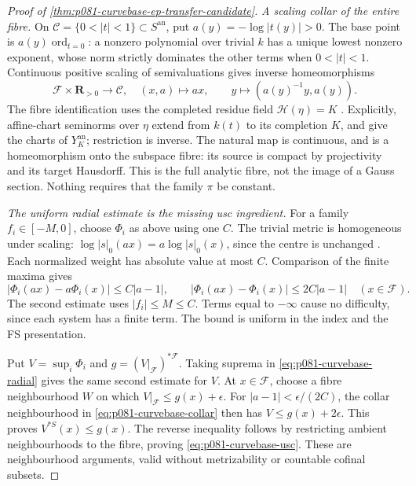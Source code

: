 \begin{proof}[Proof of \cref{thm:p081-curvebase-ep-transfer-candidate}]
\emph{A scaling collar of the entire fibre.}
On \(\mathcal C=\{0<|t|<1\}\subset S^{\mathrm{an}}\), put
\(a(y)=-\log|t(y)|>0\). The base point is
\(a(y)\operatorname{ord}_{t=0}\): a nonzero polynomial over trivial
\(k\) has a unique lowest nonzero exponent, whose norm strictly
dominates the other terms when \(0<|t|<1\).
Continuous positive scaling of semivaluations
\cite[\S1.1.4]{BJ22} gives inverse homeomorphisms
\begin{equation}\label{eq:p081-curvebase-collar}
 \mathcal F\times\mathbf R_{>0}\longrightarrow\mathcal C,\quad
 (x,a)\longmapsto ax,\qquad
 y\longmapsto(a(y)^{-1}y,a(y)).
\end{equation}
The fibre identification uses the completed residue field
\(\mathscr H(\eta)=K\)
\cite[Definition/Exercise~4.1.7.1 and \S5.1.1]{Temkin2011}.
Explicitly, affine-chart seminorms over \(\eta\) extend from \(k(t)\)
to its completion \(K\), and give the charts of \(Y_K^{\mathrm{an}}\);
restriction is inverse. The natural map is continuous, and is a
homeomorphism onto the subspace fibre: its source is compact by
projectivity and its target Hausdorff. This is the full analytic fibre,
not the image of a Gauss section. Nothing requires that the family
\(\pi\) be constant.

\emph{The uniform radial estimate is the missing usc ingredient.}
For a family \(f_i\in[-M,0]\), choose \(\Phi_i\) as above using one
\(C\). The trivial metric is homogeneous under scaling:
\(\log|s|_0(ax)=a\log|s|_0(x)\), since the centre is unchanged
\cite[Remark~1.24 and \S1.1.4]{BJ22}. Each normalized weight has
absolute value at most \(C\). Comparison of the finite maxima gives
\begin{equation}\label{eq:p081-curvebase-radial}
 |\Phi_i(ax)-a\Phi_i(x)|\leq C|a-1|,\qquad
 |\Phi_i(ax)-\Phi_i(x)|\leq2C|a-1| \quad(x\in\mathcal F).
\end{equation}
The second estimate uses \(|f_i|\leq M\leq C\). Terms equal to
\(-\infty\) cause no difficulty, since each system has a finite term.
The bound is uniform in the index and the FS presentation.

Put \(V=\sup_i\Phi_i\) and \(g=(V|_{\mathcal F})^{*\mathcal F}\).
Taking suprema in \eqref{eq:p081-curvebase-radial} gives the same
second estimate for \(V\). At \(x\in\mathcal F\), choose a fibre
neighbourhood \(W\) on which \(V|_{\mathcal F}\leq g(x)+\epsilon\).
For \(|a-1|<\epsilon/(2C)\), the collar neighbourhood in
\eqref{eq:p081-curvebase-collar} then has \(V\leq g(x)+2\epsilon\).
This proves \(V^{*S}(x)\leq g(x)\). The reverse inequality follows
by restricting ambient neighbourhoods to the fibre, proving
\eqref{eq:p081-curvebase-usc}. These are neighbourhood arguments,
valid without metrizability or countable cofinal subsets.


\end{proof}
